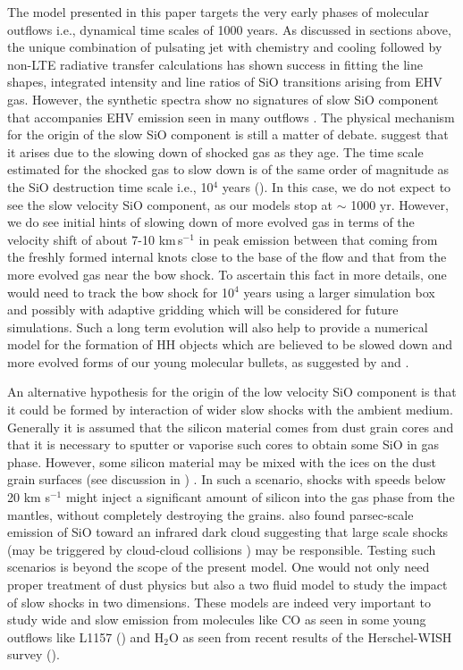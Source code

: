 \documentclass[useAMS,usenatbib]{mn2e}
\begin{document}
The model presented in this paper targets the very early phases of molecular
outflows i.e., dynamical time scales of 1000 years.
As discussed in sections above, the unique combination of pulsating
jet with chemistry and cooling followed by non-LTE radiative transfer
calculations has shown success in fitting the line shapes, integrated intensity and line ratios of SiO
transitions arising from EHV gas. However, the synthetic spectra show
no signatures of slow SiO component that accompanies EHV emission seen
in many outflows \citep[e.g.,][]{Lefloch:1998p13983,
  Codella:1999p12584}. 
The physical mechanism for the origin of the slow SiO component is still a matter
of debate. \cite{Codella:1999p12584} suggest that it arises due to the slowing down of
shocked gas as they age. The time scale estimated for the shocked gas
to slow down is of the same order of magnitude as the SiO destruction
time scale i.e., 10$^{4}$ years (\citealt{Codella:1999p12584}). In this
case, we do not expect to see the slow velocity SiO component, as our
models stop at $\sim$ 1000 yr. However, we do see initial 
hints of slowing down of more evolved gas in terms of the velocity
shift of about 7-10 km\,s$^{-1}$ in peak emission between that
coming from the freshly formed internal knots close to the base of the
flow and that from the more evolved gas near the
bow shock. To ascertain this fact in more details, one would
need to track the bow shock for 10$^{4}$ years
using a larger simulation box and possibly with adaptive gridding 
which will be considered for future simulations. Such a long term
evolution will also help to provide a numerical model for the formation of HH objects
which are believed to be slowed down and more evolved forms of our
young molecular bullets, as suggested by \cite{Norman:1979p14858} and
  \cite{Hartigan:1987p11178}.
%

An alternative hypothesis for the origin of the low velocity SiO
component is that it could be formed by interaction of wider slow
shocks with the ambient medium. Generally it is assumed that the silicon material comes from dust
grain cores and that it is necessary to sputter or vaporise such cores
to obtain some SiO in gas phase. However, some silicon material may be
mixed with the ices on the dust grain surfaces (see discussion in \citealt{Schilke:1997p14140}) . In such a scenario, 
shocks with speeds below 20 km s$^{-1}$ might inject a significant
amount of silicon into the gas phase from the mantles, without 
completely destroying the grains. \cite{JimenezSerra:2010p15530} also found parsec-scale emission of SiO
toward an infrared dark cloud suggesting that large scale shocks (may
be triggered by cloud-cloud collisions \citealt{Henshaw:2013p15540}) may
be responsible.
Testing such scenarios is beyond
the scope of the present model. One would not only need proper
treatment of dust physics but also a two fluid model to study the impact
of slow shocks in two dimensions. These models are indeed very
important to study wide and slow emission from molecules like CO 
as seen in some young outflows like L1157 (\citealt{GomezRuiz:2013p14549})
and H$_{2}$O as seen from recent results of the Herschel-WISH survey
(\citealt{Tafalla:2013p12586}).
\end{document}
